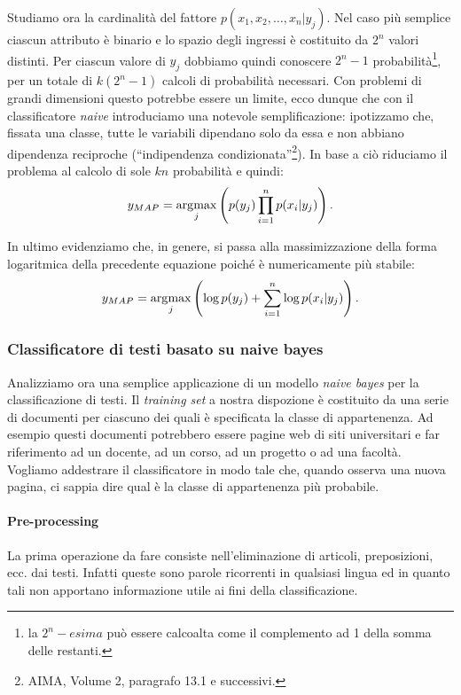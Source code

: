Studiamo ora la cardinalità del fattore $ p(x_1,x_2,\dots,x_n | y_j)$. Nel caso più semplice ciascun attributo è binario e lo spazio  degli ingressi è costituito da  $2^n$ valori distinti. Per ciascun valore di $y_j$ dobbiamo quindi conoscere $2^n-1$ probabilità\footnote{la $2^n-esima$ può essere calcoalta come il complemento ad 1 della somma delle restanti.}, per un totale di $k(2^n-1)$ calcoli di probabilità necessari. Con problemi di grandi dimensioni questo potrebbe essere un limite, ecco dunque che con il classificatore \emph{naive} introduciamo una notevole semplificazione: ipotizzamo che, fissata una classe, tutte le variabili dipendano solo da essa e non abbiano dipendenza reciproche (``indipendenza condizionata''\footnote{AIMA, Volume 2, paragrafo 13.1 e successivi.}). In base a ciò riduciamo il problema al calcolo di sole $kn$ probabilità e quindi:
\begin{equation}\label{eqymap}
y_{MAP} = \operatorname*{arg\!\max}_{j} \left(  p(y_j) \prod_{i=1}^n p(x_i| y_j)\right).
\end{equation}

In ultimo evidenziamo che, in genere, si passa alla massimizzazione della forma logaritmica della precedente equazione poiché è numericamente più stabile:
\begin{equation}\label{eqlog_ymap}
y_{MAP} = \operatorname*{arg\!\max}_{j} \left(  \log p(y_j)  +\sum_{i=1}^n \log p(x_i| y_j)\right).
\end{equation}

\subsubsection{Classificatore di testi basato su naive bayes}
Analizziamo ora una semplice applicazione di un modello \emph{naive bayes} per la classificazione di testi. Il \emph{training set} a nostra dispozione è costituito da una serie di documenti per ciascuno dei quali è specificata la classe di appartenenza. Ad esempio questi documenti potrebbero essere pagine web di siti universitari e far riferimento ad un docente, ad un corso, ad un progetto o ad una facoltà. Vogliamo addestrare il classificatore in modo tale che, quando osserva una nuova pagina, ci sappia dire qual è la classe di appartenenza più probabile.

\paragraph{Pre-processing}
La prima operazione da fare consiste nell'eliminazione di articoli, preposizioni, ecc. dai testi. Infatti queste sono parole ricorrenti in qualsiasi lingua ed in quanto tali non apportano informazione utile ai fini della classificazione.

